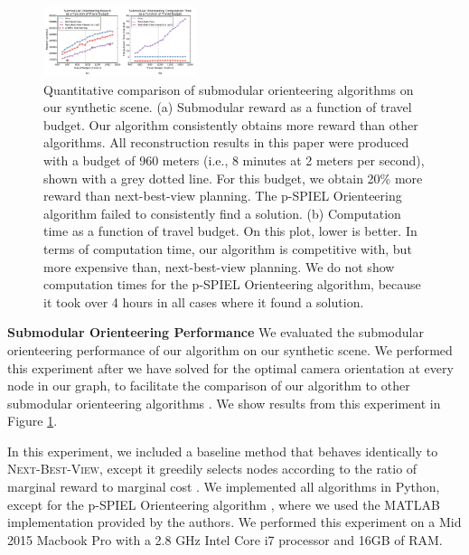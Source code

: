 \begin{figure}[t]
\begin{center}
\includegraphics[width=0.40\textwidth]{images/2017_iccv/00_quantitative.pdf}{\vspace{-14pt}}
\end{center}
\caption{
Quantitative comparison of submodular orienteering algorithms on our synthetic scene.
(a) Submodular reward as a function of travel budget.
Our algorithm consistently obtains more reward than other algorithms.
All reconstruction results in this paper were produced with a budget of 960 meters (i.e., 8 minutes at 2 meters per second), shown with a grey dotted line.
For this budget, we obtain 20\% more reward than next-best-view planning. The p-SPIEL Orienteering algorithm \cite{singh:2009b} failed to consistently find a solution.
(b) Computation time as a function of travel budget.
On this plot, lower is better.
In terms of computation time, our algorithm is competitive with, but more expensive than, next-best-view planning.
We do not show computation times for the p-SPIEL Orienteering algorithm, because it took over 4 hours in all cases where it found a solution.\vspace{-6pt}
\vspace{-4pt}
}
\label{fig:results_orienteering}
\end{figure}

\vspace{3pt}
\textbf{Submodular Orienteering Performance}
\label{sec:submodperf}
We evaluated the submodular orienteering performance of our algorithm on our synthetic scene.
We performed this experiment after we have solved for the optimal camera orientation at every node in our graph, to facilitate the comparison of our algorithm to other submodular orienteering algorithms \cite{singh:2009b,zhang:2016}.
We show results from this experiment in Figure \ref{fig:results_orienteering}.

In this experiment, we included a baseline method that behaves identically to \textsc{Next-Best-View}, except it greedily selects nodes according to the ratio of marginal reward to marginal cost \cite{zhang:2016}.
We implemented all algorithms in Python, except for the p-SPIEL Orienteering algorithm \cite{singh:2009b}, where we used the MATLAB implementation provided by the authors.
We performed this experiment on a Mid 2015 Macbook Pro with a 2.8 GHz Intel Core i7 processor and 16GB of RAM.

